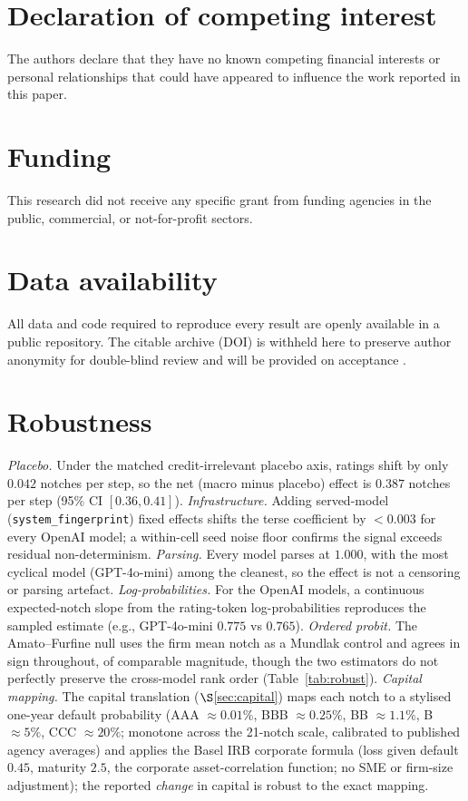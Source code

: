 \documentclass[a4paper,fleqn]{cas-sc}
\begin{document}
\section*{Declaration of competing interest}
The authors declare that they have no known competing financial interests or personal relationships
that could have appeared to influence the work reported in this paper.

\section*{Funding}
This research did not receive any specific grant from funding agencies in the public, commercial, or
not-for-profit sectors.

\section*{Data availability}
All data and code required to reproduce every result are openly available in a public repository.
The citable archive (DOI) is withheld here to preserve author anonymity for double-blind review and
will be provided on acceptance \citep{artifact2026}.

\appendix
\section{Robustness}\label{app:robust}

\emph{Placebo.} Under the matched credit-irrelevant placebo axis, ratings shift by only $0.042$ notches
per step, so the net (macro minus placebo) effect is $0.387$ notches per step (95\% CI $[0.36,0.41]$).
\emph{Infrastructure.} Adding served-model (\texttt{system\_fingerprint}) fixed effects shifts the
terse coefficient by $<0.003$ for every OpenAI model; a within-cell seed noise floor confirms the
signal exceeds residual non-determinism. \emph{Parsing.} Every model parses at $1.000$, with the most
cyclical model (GPT-4o-mini) among the cleanest, so the effect is not a censoring or parsing artefact.
\emph{Log-probabilities.} For the OpenAI models, a continuous expected-notch slope from the
rating-token log-probabilities reproduces the sampled estimate (e.g., GPT-4o-mini $0.775$ vs $0.765$).
\emph{Ordered probit.} The Amato--Furfine null uses the firm mean notch as a Mundlak control and agrees
in sign throughout, of comparable magnitude, though the two estimators do not perfectly preserve the
cross-model rank order (Table~\ref{tab:robust}). \emph{Capital mapping.} The capital translation
($\S$\ref{sec:capital}) maps each notch to a stylised one-year default probability (AAA $\approx
0.01\%$, BBB $\approx 0.25\%$, BB $\approx 1.1\%$, B $\approx 5\%$, CCC $\approx 20\%$; monotone across
the 21-notch scale, calibrated to published agency averages) and applies the Basel IRB corporate
formula (loss given default $0.45$, maturity $2.5$, the corporate asset-correlation function; no SME or
firm-size adjustment); the reported \emph{change} in capital is robust to the exact mapping.
\end{document}
